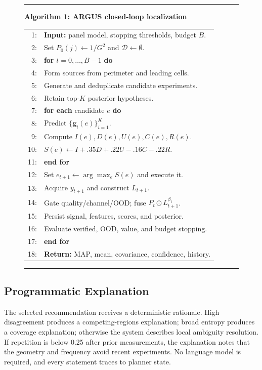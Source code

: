 \documentclass[conference]{IEEEtran}
\newcommand{\vect}[1]{\boldsymbol{#1}}
\begin{document}
\begin{figure}[t]
\centering
\begin{minipage}{0.98\columnwidth}
\hrule
\vspace{1mm}
\noindent\textbf{Algorithm 1: ARGUS closed-loop localization}\par
\small
\begin{tabular}{@{}r p{}@{}}
1: & \textbf{Input:} panel model, stopping thresholds, budget $B$.\\
2: & Set $P_0(j)\gets1/G^2$ and $\mathcal{D}\gets\emptyset$.\\
3: & \textbf{for} $t=0,\ldots,B-1$ \textbf{do}\\
4: & \quad Form sources from perimeter and leading cells.\\
5: & \quad Generate and deduplicate candidate experiments.\\
6: & \quad Retain top-$K$ posterior hypotheses.\\
7: & \quad \textbf{for each} candidate $e$ \textbf{do}\\
8: & \qquad Predict $\{\vect g_i(e)\}_{i=1}^{K}$.\\
9: & \qquad Compute $I(e),D(e),U(e),C(e),R(e)$.\\
10: & \qquad $S(e)\gets I+.35D+.22U-.16C-.22R$.\\
11: & \quad \textbf{end for}\\
12: & \quad Set $e_{t+1}\gets\arg\max_eS(e)$ and execute it.\\
13: & \quad Acquire $y_{t+1}$ and construct $L_{t+1}$.\\
14: & \quad Gate quality/channel/OOD; fuse $P_t\odot L_{t+1}^{\beta_t}$.\\
15: & \quad Persist signal, features, scores, and posterior.\\
16: & \quad Evaluate verified, OOD, value, and budget stopping.\\
17: & \textbf{end for}\\
18: & \textbf{Return:} MAP, mean, covariance, confidence, history.\\
\end{tabular}
\vspace{1mm}
\hrule
\end{minipage}
\label{alg:argus}
\end{figure}

\subsection{Programmatic Explanation}
The selected recommendation receives a deterministic rationale. High disagreement produces a competing-regions explanation; broad entropy produces a coverage explanation; otherwise the system describes local ambiguity resolution. If repetition is below 0.25 after prior measurements, the explanation notes that the geometry and frequency avoid recent experiments. No language model is required, and every statement traces to planner state.
\end{document}
